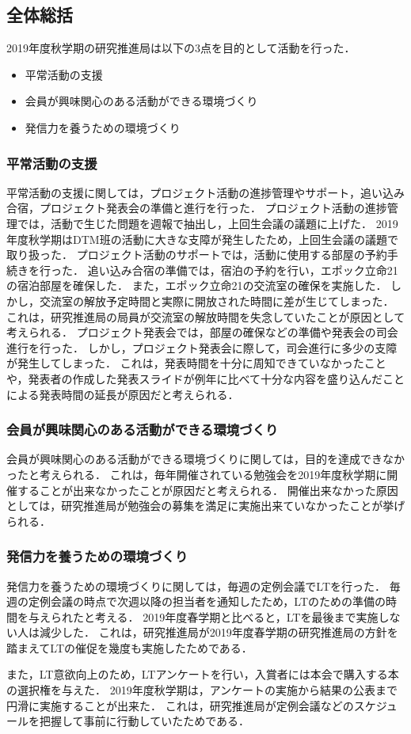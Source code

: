 \subsection*{全体総括}

2019年度秋学期の研究推進局は以下の3点を目的として活動を行った．
\begin{itemize}
\item 平常活動の支援
\item 会員が興味関心のある活動ができる環境づくり
\item 発信力を養うための環境づくり
\end{itemize}

\subsubsection*{平常活動の支援}
平常活動の支援に関しては，プロジェクト活動の進捗管理やサポート，追い込み合宿，プロジェクト発表会の準備と進行を行った．
プロジェクト活動の進捗管理では，活動で生じた問題を週報で抽出し，上回生会議の議題に上げた．
2019年度秋学期はDTM班の活動に大きな支障が発生したため，上回生会議の議題で取り扱った．
プロジェクト活動のサポートでは，活動に使用する部屋の予約手続きを行った．
追い込み合宿の準備では，宿泊の予約を行い，エポック立命21の宿泊部屋を確保した．
また，エポック立命21の交流室の確保を実施した．
しかし，交流室の解放予定時間と実際に開放された時間に差が生じてしまった．
これは，研究推進局の局員が交流室の解放時間を失念していたことが原因として考えられる．
プロジェクト発表会では，部屋の確保などの準備や発表会の司会進行を行った．
しかし，プロジェクト発表会に際して，司会進行に多少の支障が発生してしまった．
これは，発表時間を十分に周知できていなかったことや，発表者の作成した発表スライドが例年に比べて十分な内容を盛り込んだことによる発表時間の延長が原因だと考えられる．

\subsubsection*{会員が興味関心のある活動ができる環境づくり} 
会員が興味関心のある活動ができる環境づくりに関しては，目的を達成できなかったと考えられる．
これは，毎年開催されている勉強会を2019年度秋学期に開催することが出来なかったことが原因だと考えられる．
開催出来なかった原因としては，研究推進局が勉強会の募集を満足に実施出来ていなかったことが挙げられる．

\subsubsection*{発信力を養うための環境づくり} 
発信力を養うための環境づくりに関しては，毎週の定例会議でLTを行った．
毎週の定例会議の時点で次週以降の担当者を通知したため，LTのための準備の時間を与えられたと考える．
2019年度春学期と比べると，LTを最後まで実施しない人は減少した．
これは，研究推進局が2019年度春学期の研究推進局の方針を踏まえてLTの催促を幾度も実施したためである．

また，LT意欲向上のため，LTアンケートを行い，入賞者には本会で購入する本の選択権を与えた．
2019年度秋学期は，アンケートの実施から結果の公表まで円滑に実施することが出来た．
これは，研究推進局が定例会議などのスケジュールを把握して事前に行動していたためである．

